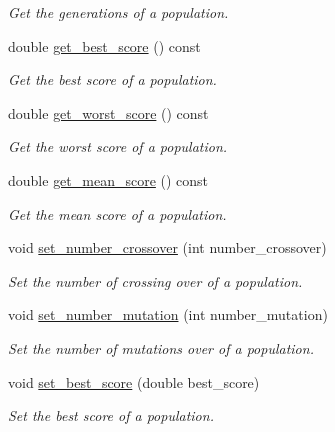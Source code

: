 \begin{DoxyCompactItemize}
\begin{DoxyCompactList}\small\item\em Get the generations of a population. \end{DoxyCompactList}\item 
double \hyperlink{class_population__clustered_a8003d1f89c0bda4dec1578168dbca0ae}{get\+\_\+best\+\_\+score} () const
\begin{DoxyCompactList}\small\item\em Get the best score of a population. \end{DoxyCompactList}\item 
double \hyperlink{class_population__clustered_a62cf77b998887914248633a29a432e81}{get\+\_\+worst\+\_\+score} () const
\begin{DoxyCompactList}\small\item\em Get the worst score of a population. \end{DoxyCompactList}\item 
double \hyperlink{class_population__clustered_a09317877b808df0255f429ba10eacfc9}{get\+\_\+mean\+\_\+score} () const
\begin{DoxyCompactList}\small\item\em Get the mean score of a population. \end{DoxyCompactList}\item 
void \hyperlink{class_population__clustered_ac4337d1263af1c208478cfdc20536254}{set\+\_\+number\+\_\+crossover} (int number\+\_\+crossover)
\begin{DoxyCompactList}\small\item\em Set the number of crossing over of a population. \end{DoxyCompactList}\item 
void \hyperlink{class_population__clustered_ab9e60e2a8ae0388db9de7ea071687c9e}{set\+\_\+number\+\_\+mutation} (int number\+\_\+mutation)
\begin{DoxyCompactList}\small\item\em Set the number of mutations over of a population. \end{DoxyCompactList}\item 
void \hyperlink{class_population__clustered_aad565e8b33c7db54d69a8d59623eea2b}{set\+\_\+best\+\_\+score} (double best\+\_\+score)
\begin{DoxyCompactList}\small\item\em Set the best score of a population. \end{DoxyCompactList}\item 

\end{DoxyCompactItemize}
